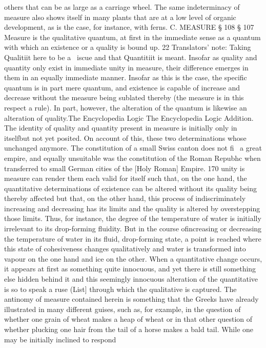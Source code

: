 {{others that can be as large as a carriage wheel. The same indeterminacy of measure
also shows itself in many plants that are at a low level of organic development, as
is the case, for instance, with ferns.
C. MEASURE § 108
§ 107
Measure is the qualitative quantum, at first in the immediate sense as a
quantum with which an existence or a quality is bound up.
22
Translators' note: Taking Qualitiit here to be a ~iscue and that Quantitiit is meant.
Insofar as quality and quantity only exist in immediate unity in measure,
their difference emerges in them in an equally immediate manner. Insofar
as this is the case, the specific quantum is in part mere quantum, and
existence is capable of increase and decrease without the measure being
sublated thereby (the measure is in this respect a rule). In part, however,
the alteration of the quantum is likewise an alteration of quality.The Encyclopedia Logic The Encyclopedia Logic
Addition. The identity of quality and quantity present in measure is initially only
in itselfbut not yet posited. On account of this, these two determinations whose unchanged anymore. The constitution of a small Swiss canton does not fi~ a great
empire, and equally unsuitable was the constitution of the Roman Repubhc when
transferred to small German cities of the [Holy Roman] Empire.
170
unity is measure can render them each valid for itself such that, on the one hand,
the quantitative determinations of existence can be altered without its quality
being thereby affected but that, on the other hand, this process of indiscriminately
increasing and decreasing has its limits and the quality is altered by overstepping
those limits. Thus, for instance, the degree of the temperature of water is initially
irrelevant to its drop-forming fluidity. But in the course ofincreasing or decreasing
the temperature of water in its fluid, drop-forming state, a point is reached where
this state of cohesiveness changes qualitatively and water is transformed into vapour
on the one hand and ice on the other. When a quantitative change occurs, it appears
at first as something quite innocuous, and yet there is still something else hidden
behind it and this seemingly innocuous alteration of the quantitative is so to speak
a ruse (List] through which the qualitative is captured. The antinomy of measure
contained herein is something that the Greeks have already illustrated in many
different guises, such as, for example, in the question of whether one grain of wheat
makes a heap of wheat or in that other question of whether plucking one hair from
the tail of a horse makes a bald tail. While one may be initially inclined to respond
}}
